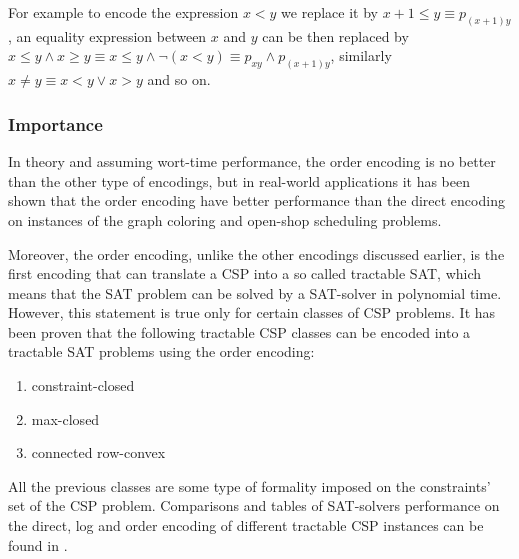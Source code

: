 For example to encode the expression $x < y$ we replace it by $x + 1 \leq y \equiv p_{(x+1)y}$, an equality expression between $x$ and $y$ can be then replaced by $x \leq y \wedge x \geq y \equiv x \leq y \wedge \neg (x < y) \equiv p_{xy} \wedge p_{(x+1)y}$, similarly $x \neq y \equiv x < y \vee x > y$ and so on.

\subsubsection{Importance}
In theory and assuming wort-time performance, the order encoding is no better than the other type of encodings, but in real-world applications it has been shown that the order encoding have better performance than the direct encoding on instances of the graph coloring and open-shop scheduling problems. \cite{tamura2009compiling}

Moreover, the order encoding, unlike the other encodings discussed earlier, is the first encoding that can translate a CSP into a so called tractable SAT, which means that the SAT problem can be solved by a SAT-solver in polynomial time. However, this statement is true only for certain classes of CSP problems. It has been proven that the following tractable CSP classes can be encoded into a tractable SAT problems using the order encoding: \cite{petke2011order}
\begin{enumerate}
	\item constraint-closed
	\item max-closed
	\item connected row-convex
\end{enumerate}
All the previous classes are some type of formality imposed on the constraints' set of the CSP problem. Comparisons and tables of SAT-solvers performance on the direct, log and order encoding of different tractable CSP instances can be found in \cite{petke2011order}.


